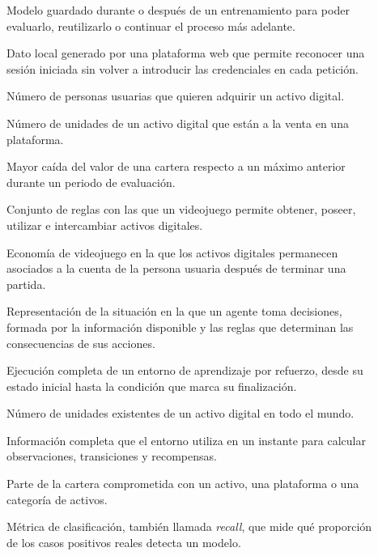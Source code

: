 \begin{description}
  \item[] Modelo guardado durante o después de un entrenamiento para poder evaluarlo, reutilizarlo o continuar el proceso más adelante.
  \item[] Dato local generado por una plataforma web que permite reconocer una sesión iniciada sin volver a introducir las credenciales en cada petición.
  \item[] Número de personas usuarias que quieren adquirir un activo digital.
  \item[] Número de unidades de un activo digital que están a la venta en una plataforma.
  \item[] Mayor caída del valor de una cartera respecto a un máximo anterior durante un periodo de evaluación.
  \item[] Conjunto de reglas con las que un videojuego permite obtener, poseer, utilizar e intercambiar activos digitales.
  \item[] Economía de videojuego en la que los activos digitales permanecen asociados a la cuenta de la persona usuaria después de terminar una partida.
  \item[] Representación de la situación en la que un agente toma decisiones, formada por la información disponible y las reglas que determinan las consecuencias de sus acciones.
  \item[] Ejecución completa de un entorno de aprendizaje por refuerzo, desde su estado inicial hasta la condición que marca su finalización.
  \item[] Número de unidades existentes de un activo digital en todo el mundo.
  \item[] Información completa que el entorno utiliza en un instante para calcular observaciones, transiciones y recompensas.
  \item[] Parte de la cartera comprometida con un activo, una plataforma o una categoría de activos.
  \item[] Métrica de clasificación, también llamada \emph{recall}, que mide qué proporción de los casos positivos reales detecta un modelo.

\end{description}
